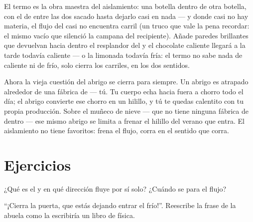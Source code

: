 \begin{example}[El termo]\label{ex:g5:heat-and-insulation:thermos}
El termo es la obra maestra del aislamiento: una botella dentro de
otra botella, con el  de entre las dos sacado hasta dejarlo casi
en nada --- y donde casi no hay materia, el flujo del  casi no
encuentra carril (un truco que vale la pena recordar: el mismo vacío
que silenció la campana del recipiente). Añade paredes brillantes que
devuelvan hacia dentro el resplandor del  y el chocolate caliente
llegará a la tarde todavía caliente --- o la limonada todavía fría: el
termo no sabe nada de caliente ni de frío, solo cierra los carriles,
en los dos sentidos.
\end{example}

\begin{remark}\label{rem:g5:heat-and-insulation:coat}
Ahora la vieja cuestión del abrigo se cierra para siempre. Un abrigo
es  atrapado alrededor de una fábrica de  --- tú. Tu
cuerpo echa  hacia fuera a chorro todo el día; el abrigo
convierte ese chorro en un hilillo, y tú te quedas calentito con tu
propia producción. Sobre el muñeco de nieve --- que no tiene ninguna
fábrica de  dentro --- ese mismo abrigo se limita a frenar el
hilillo del verano que entra. El aislamiento no tiene favoritos: frena
el flujo, corra en el sentido que corra.
\end{remark}

\section{Ejercicios}

\begin{exercise}[$\star$]\label{exo:g5:heat-and-insulation:1}
¿Qué es el  y en qué dirección fluye por sí solo? ¿Cuándo se
para el flujo?
\end{exercise}

\begin{exercise}[$\star$]\label{exo:g5:heat-and-insulation:2}
``¡Cierra la puerta, que estás dejando entrar el frío!''. Reescribe la
frase de la abuela como la escribiría un libro de física.
\end{exercise}

